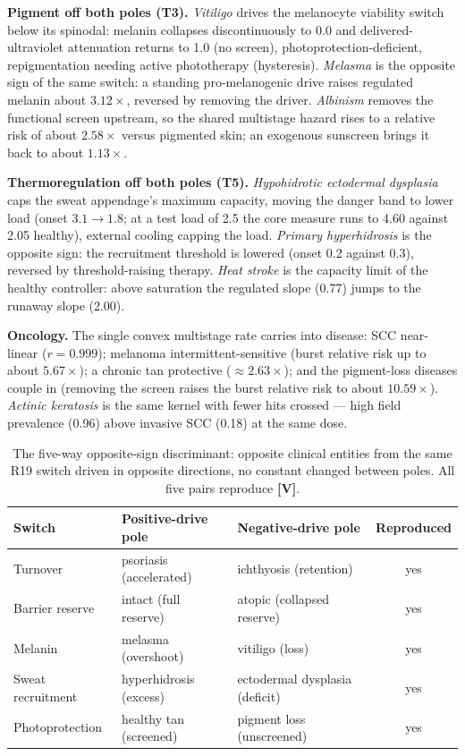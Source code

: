 \documentclass[11pt,a4paper]{article}
\newcommand{\V}{\textcolor{gV}{\textbf{[V]}}}
\newcommand{\mul}{\ensuremath{\times}}
\newcommand{\apx}{\ensuremath{\approx}}
\begin{document}
\textbf{Pigment off both poles (T3).} \emph{Vitiligo} drives the melanocyte viability switch below its spinodal:
melanin collapses discontinuously to 0.0 and delivered-ultraviolet attenuation returns to 1.0 (no screen),
photoprotection-deficient, repigmentation needing active phototherapy (hysteresis). \emph{Melasma} is the opposite
sign of the same switch: a standing pro-melanogenic drive raises regulated melanin about $3.12\mul$, reversed by
removing the driver. \emph{Albinism} removes the functional screen upstream, so the shared multistage hazard rises
to a relative risk of about $2.58\mul$ versus pigmented skin; an exogenous sunscreen brings it back to about
$1.13\mul$.

\textbf{Thermoregulation off both poles (T5).} \emph{Hypohidrotic ectodermal dysplasia} caps the sweat
appendage's maximum capacity, moving the danger band to lower load (onset $3.1\to1.8$; at a test load of 2.5 the
core measure runs to 4.60 against 2.05 healthy), external cooling capping the load. \emph{Primary hyperhidrosis} is
the opposite sign: the recruitment threshold is lowered (onset 0.2 against 0.3), reversed by threshold-raising
therapy. \emph{Heat stroke} is the capacity limit of the healthy controller: above saturation the regulated
slope (0.77) jumps to the runaway slope (2.00).

\textbf{Oncology.} The single convex multistage rate carries into disease: SCC near-linear ($r=0.999$); melanoma
intermittent-sensitive (burst relative risk up to about $5.67\mul$); a chronic tan protective ($\apx 2.63\mul$);
and the pigment-loss diseases couple in (removing the screen raises the burst relative risk to about $10.59\mul$).
\emph{Actinic keratosis} is the same kernel with fewer hits crossed --- high field prevalence (0.96) above invasive
SCC (0.18) at the same dose.

\begin{table}[h]
\centering\small
\caption{The five-way opposite-sign discriminant: opposite clinical entities from the same R19 switch driven in
opposite directions, no constant changed between poles. All five pairs reproduce \V.}
\begin{tabular}{l l l c}
\toprule
\textbf{Switch} & \textbf{Positive-drive pole} & \textbf{Negative-drive pole} & \textbf{Reproduced}\\
\midrule
Turnover         & psoriasis (accelerated)     & ichthyosis (retention)              & yes\\
Barrier reserve  & intact (full reserve)       & atopic (collapsed reserve)          & yes\\
Melanin          & melasma (overshoot)         & vitiligo (loss)                     & yes\\
Sweat recruitment& hyperhidrosis (excess)      & ectodermal dysplasia (deficit)      & yes\\
Photoprotection  & healthy tan (screened)      & pigment loss (unscreened)           & yes\\
\bottomrule
\end{tabular}
\end{table}
\end{document}
